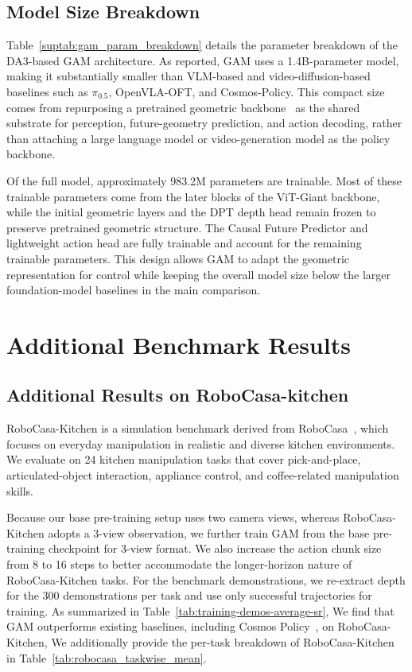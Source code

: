 \subsection{Model Size Breakdown}
\label{sec:appendix-params_breakdown}

Table~\ref{suptab:gam_param_breakdown} details the parameter breakdown of the DA3-based GAM architecture. As reported, GAM uses a 1.4B-parameter model, making it substantially smaller than VLM-based and video-diffusion-based baselines such as $\pi_{0.5}$, OpenVLA-OFT, and Cosmos-Policy. This compact size comes from repurposing a pretrained geometric backbone~\cite{lin2025depth} as the shared substrate for perception, future-geometry prediction, and action decoding, rather than attaching a large language model or video-generation model as the policy backbone.

Of the full model, approximately 983.2M parameters are trainable. Most of these trainable parameters come from the later blocks of the ViT-Giant backbone, while the initial geometric layers and the DPT depth head remain frozen to preserve pretrained geometric structure. The Causal Future Predictor and lightweight action head are fully trainable and account for the remaining trainable parameters. This design allows GAM to adapt the geometric representation for control while keeping the overall model size below the larger foundation-model baselines in the main comparison.


\section{Additional Benchmark Results}
\label{sec:appendix-additional_results}
\subsection{Additional Results on RoboCasa-kitchen}
\label{sec:appendix-robocasa}


RoboCasa-Kitchen is a simulation benchmark derived from RoboCasa~\cite{nasiriany2024robocasa}, which focuses on everyday manipulation in realistic and diverse kitchen environments. We evaluate on 24 kitchen manipulation tasks that cover pick-and-place, articulated-object interaction, appliance control, and coffee-related manipulation skills.

Because our base pre-training setup uses two camera views, whereas RoboCasa-Kitchen adopts a 3-view observation, we further train GAM from the base pre-training checkpoint for 3-view format. We also increase the action chunk size from 8 to 16 steps to better accommodate the longer-horizon nature of RoboCasa-Kitchen tasks. For the benchmark demonstrations, we re-extract depth for the 300 demonstrations per task and use only successful trajectories for training. As summarized in Table~\ref{tab:training-demos-average-sr}, We find that GAM outperforms existing baselines, including Cosmos Policy~\cite{kim2026cosmos}, on RoboCasa-Kitchen,  We additionally provide the per-task breakdown of RoboCasa-Kitchen in Table~\ref{tab:robocasa_taskwise_mean}.


